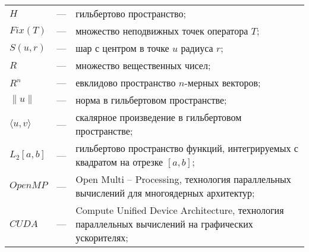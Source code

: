 
\begin{longtable}{lp{}p{}}
	
$H$ & --- & гильбертово пространство;\\

$Fix(T)$ & --- & множество неподвижных точек оператора $T$;\\

$S(u, r)$ & --- & шар с центром в точке $u$ радиуса $r$;\\

$R$ & --- & множество вещественных чисел;\\

$R^n$ & --- & евклидово пространство $n$-мерных векторов; \\

$\|u\|$ & --- & норма в гильбертовом пространстве;\\

$\langle u, v\rangle$ & --- & скалярное произведение в гильбертовом пространстве;\\

$L_2[a, b]$ & --- & гильбертово пространство функций, интегрируемых с квадратом на отрезке $[a, b]$;\\

$OpenMP$ & --- & Open Multi -- Processing, технология параллельных вычислений для многоядерных архитектур;\\

$CUDA$ & --- & Compute Unified Device Architecture, технология параллельных вычислений на графических ускорителях;\\

\end{longtable}
